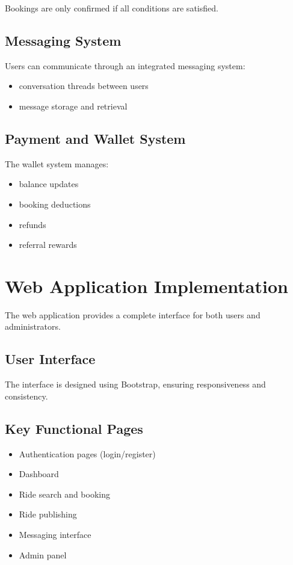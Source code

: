 Bookings are only confirmed if all conditions are satisfied.

\subsection{Messaging System}

Users can communicate through an integrated messaging system:
\begin{itemize}[noitemsep]
    \item conversation threads between users
    \item message storage and retrieval
\end{itemize}

\subsection{Payment and Wallet System}

The wallet system manages:
\begin{itemize}[noitemsep]
    \item balance updates
    \item booking deductions
    \item refunds
    \item referral rewards
\end{itemize}

\section{Web Application Implementation}

The web application provides a complete interface for both users and administrators.

\subsection{User Interface}

The interface is designed using Bootstrap, ensuring responsiveness and consistency.

\subsection{Key Functional Pages}

\begin{itemize}[noitemsep]
    \item Authentication pages (login/register)
    \item Dashboard
    \item Ride search and booking
    \item Ride publishing
    \item Messaging interface
    \item Admin panel
\end{itemize}

